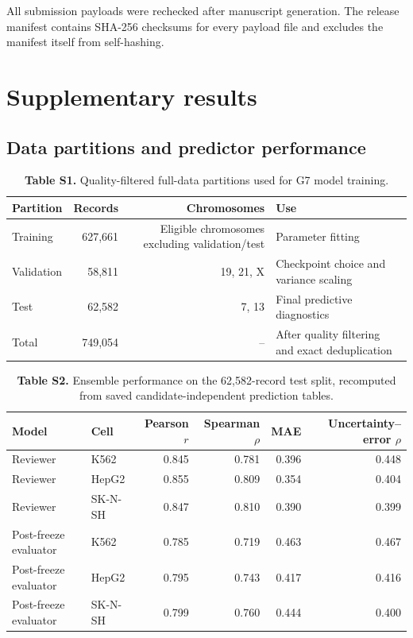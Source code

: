 \documentclass[10pt,a4paper]{article}
\begin{document}
All submission payloads were rechecked after manuscript generation. The release
manifest contains SHA-256 checksums for every payload file and excludes the manifest
itself from self-hashing.

\section{Supplementary results}

\subsection{Data partitions and predictor performance}

\begin{table}[ht]
\centering
\caption{\textbf{Table S1.} Quality-filtered full-data partitions used for G7 model training.}
\label{tab:S1}
{\small
\begin{tabular}{lrrp{4.5cm}}
\toprule
Partition & Records & Chromosomes & Use \\
\midrule
Training & 627,661 & Eligible chromosomes excluding validation/test & Parameter fitting \\
Validation & 58,811 & 19, 21, X & Checkpoint choice and variance scaling \\
Test & 62,582 & 7, 13 & Final predictive diagnostics \\
\midrule
Total & 749,054 & -- & After quality filtering and exact deduplication \\
\bottomrule
\end{tabular}
}
\end{table}

\begin{table}[ht]
\centering
\caption{\textbf{Table S2.} Ensemble performance on the 62,582-record test split, recomputed from saved
candidate-independent prediction tables.}
\label{tab:S2}
\begin{tabular}{llrrrr}
\toprule
Model & Cell & Pearson $r$ & Spearman $\rho$ & MAE & Uncertainty--error $\rho$ \\
\midrule
Reviewer & K562 & 0.845 & 0.781 & 0.396 & 0.448 \\
Reviewer & HepG2 & 0.855 & 0.809 & 0.354 & 0.404 \\
Reviewer & SK-N-SH & 0.847 & 0.810 & 0.390 & 0.399 \\
\addlinespace
Post-freeze evaluator & K562 & 0.785 & 0.719 & 0.463 & 0.467 \\
Post-freeze evaluator & HepG2 & 0.795 & 0.743 & 0.417 & 0.416 \\
Post-freeze evaluator & SK-N-SH & 0.799 & 0.760 & 0.444 & 0.400 \\
\bottomrule
\end{tabular}
\end{table}
\end{document}
